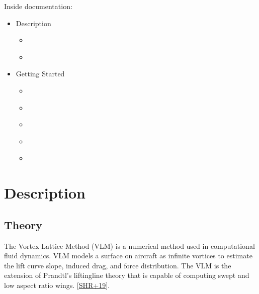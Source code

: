 \documentclass[letterpaper,10pt,english]{jupyterBook}
\begin{document}
\sphinxAtStartPar
Inside documentation:
\begin{itemize}
\item {} 
\sphinxAtStartPar
Description

\begin{itemize}
\item {} 
\sphinxAtStartPar
{\hyperref[\detokenize{chapters/description/theory::doc}]{}}

\item {} 
\sphinxAtStartPar
{\hyperref[\detokenize{chapters/description/technology::doc}]{}}

\end{itemize}
\end{itemize}
\begin{itemize}
\item {} 
\sphinxAtStartPar
Getting Started

\begin{itemize}
\item {} 
\sphinxAtStartPar
{\hyperref[\detokenize{chapters/start/installation::doc}]{}}

\item {} 
\sphinxAtStartPar
{\hyperref[\detokenize{chapters/usage/usage::doc}]{}}

\item {} 
\sphinxAtStartPar
{\hyperref[\detokenize{chapters/validation/validation::doc}]{}}

\item {} 
\sphinxAtStartPar
{\hyperref[\detokenize{chapters/conclusion::doc}]{}}

\item {} 
\sphinxAtStartPar
{\hyperref[\detokenize{chapters/bibliography::doc}]{}}

\end{itemize}
\end{itemize}

\sphinxstepscope


\part{Description}

\sphinxstepscope


\chapter{Theory}
\label{\detokenize{chapters/description/theory:theory}}\label{\detokenize{chapters/description/theory::doc}}
\sphinxAtStartPar
The Vortex Lattice Method (VLM) is a numerical method used in computational fluid dynamics. VLM models a surface on aircraft as infinite vortices to estimate the lift curve slope, induced drag, and force distribution. The VLM is the extension of Prandtl’s lifting\sphinxhyphen{}line theory that is capable of computing swept and low aspect ratio wings. {[}\hyperlink{cite.chapters/bibliography:id8}{SHR+19}{]}.
\end{document}
